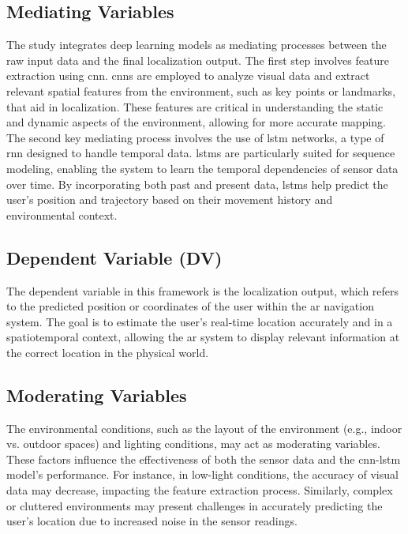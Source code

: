 \begin{refsection}
\subsection{Mediating Variables}

The study integrates deep learning models as mediating processes between the raw input data and the final localization output. The first step involves feature extraction using \gls{cnn}. \gls{cnn}s are employed to analyze visual data and extract relevant spatial features from the environment, such as key points or landmarks, that aid in localization. These features are critical in understanding the static and dynamic aspects of the environment, allowing for more accurate mapping.
The second key mediating process involves the use of \gls{lstm} networks, a type of \gls{rnn} designed to handle temporal data. \gls{lstm}s are particularly suited for sequence modeling, enabling the system to learn the temporal dependencies of sensor data over time. By incorporating both past and present data, \gls{lstm}s help predict the user's position and trajectory based on their movement history and environmental context.

\subsection{Dependent Variable (DV)}

The dependent variable in this framework is the localization output, which refers to the predicted position or coordinates of the user within the \gls{ar} navigation system. The goal is to estimate the user's real-time location accurately and in a spatiotemporal context, allowing the \gls{ar} system to display relevant information at the correct location in the physical world.

\subsection{Moderating Variables}

The environmental conditions, such as the layout of the environment (e.g., indoor vs. outdoor spaces) and lighting conditions, may act as moderating variables. These factors influence the effectiveness of both the sensor data and the \gls{cnn}-\gls{lstm} model's performance. For instance, in low-light conditions, the accuracy of visual data may decrease, impacting the feature extraction process. Similarly, complex or cluttered environments may present challenges in accurately predicting the user's location due to increased noise in the sensor readings.


\end{refsection}
